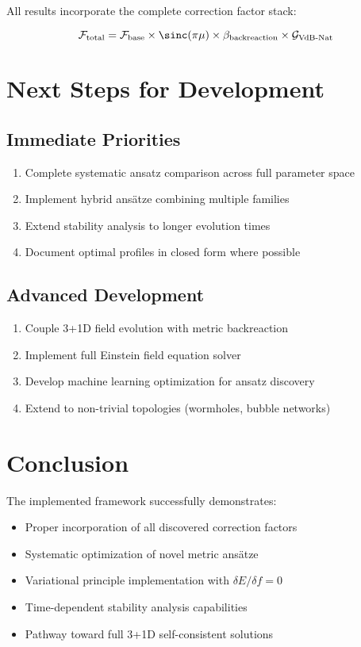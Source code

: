 \documentclass[12pt,a4paper]{article}
\begin{document}
All results incorporate the complete correction factor stack:

\begin{equation}
\mathcal{F}_{\text{total}} = \mathcal{F}_{\text{base}} \times \sinc(\pi\mu) \times \beta_{\text{backreaction}} \times \mathcal{G}_{\text{VdB-Nat}}
\end{equation}

\section{Next Steps for Development}

\subsection{Immediate Priorities}

\begin{enumerate}
\item Complete systematic ansatz comparison across full parameter space
\item Implement hybrid ansätze combining multiple families
\item Extend stability analysis to longer evolution times
\item Document optimal profiles in closed form where possible
\end{enumerate}

\subsection{Advanced Development}

\begin{enumerate}
\item Couple 3+1D field evolution with metric backreaction
\item Implement full Einstein field equation solver
\item Develop machine learning optimization for ansatz discovery
\item Extend to non-trivial topologies (wormholes, bubble networks)
\end{enumerate}

\section{Conclusion}

The implemented framework successfully demonstrates:

\begin{itemize}
\item Proper incorporation of all discovered correction factors
\item Systematic optimization of novel metric ansätze  
\item Variational principle implementation with $\delta E/\delta f = 0$
\item Time-dependent stability analysis capabilities
\item Pathway toward full 3+1D self-consistent solutions
\end{itemize}
\end{document}
